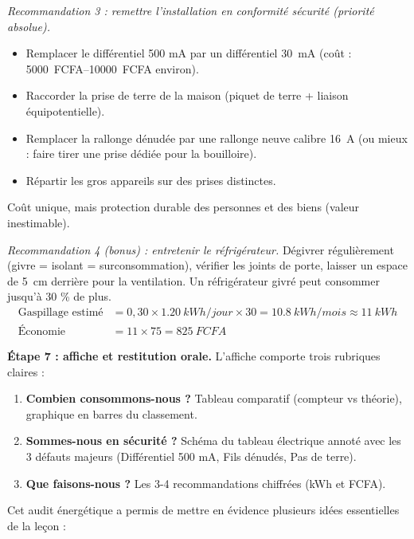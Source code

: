 \documentclass[11pt]{article}
\newcounter{popsec}
\newcounter{popsub}
\newcommand{\courssub}[1]{%
  \stepcounter{popsub}%
  \par\vspace{9pt}\noindent{\popxbold\fontsize{11.5}{13}\selectfont\color{popink}{\color{poporange}\thepopsec.\thepopsub}\hspace{6pt}#1}\par\nopagebreak\vspace{4pt}
}
\begin{document}
\begin{exoresolu}
\emph{Recommandation 3 : remettre l'installation en conformité sécurité (priorité absolue).}
\begin{itemize}
\item Remplacer le différentiel 500 mA par un différentiel \SI{30}{mA} (coût : \SIrange{5000}{10000}{FCFA} environ).
\item Raccorder la prise de terre de la maison (piquet de terre + liaison équipotentielle).
\item Remplacer la rallonge dénudée par une rallonge neuve calibre \SI{16}{A} (ou mieux : faire tirer une prise dédiée pour la bouilloire).
\item Répartir les gros appareils sur des prises distinctes.
\end{itemize}
Coût unique, mais protection durable des personnes et des biens (valeur inestimable).

\emph{Recommandation 4 (bonus) : entretenir le réfrigérateur.}
Dégivrer régulièrement (givre = isolant = surconsommation), vérifier les joints de porte, laisser un espace de \SI{5}{cm} derrière pour la ventilation. Un réfrigérateur givré peut consommer jusqu'à 30 \% de plus.
\begin{align*}
\text{Gaspillage estimé} &= 0{,}30 \times \SI{1,20}{kWh/jour} \times 30 = \SI{10,8}{kWh/mois} \approx \SI{11}{kWh} \\
\text{Économie} &= 11 \times 75 = \SI{825}{FCFA}
\end{align*}

\textbf{Étape 7 : affiche et restitution orale.}
L'affiche comporte trois rubriques claires :
\begin{enumerate}
\item \textbf{Combien consommons-nous ?} Tableau comparatif (compteur vs théorie), graphique en barres du classement.
\item \textbf{Sommes-nous en sécurité ?} Schéma du tableau électrique annoté avec les 3 défauts majeurs (Différentiel 500 mA, Fils dénudés, Pas de terre).
\item \textbf{Que faisons-nous ?} Les 3-4 recommandations chiffrées (kWh et FCFA).
\end{enumerate}

\end{exoresolu}

\courssub{Bilan de l'activité}

Cet audit énergétique a permis de mettre en évidence plusieurs idées essentielles de la leçon :
\end{document}
